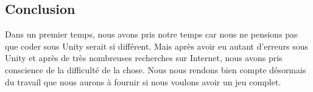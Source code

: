 \documentclass[]{extarticle}
\begin{document}
\begin{spacing}{1.25}
\section{Conclusion}
\bigbreak
\bigbreak
Dans un premier temps, nous avons pris notre temps car nous ne pensions pas que coder sous Unity serait si différent. Mais après avoir eu autant d'erreurs sous Unity et après de très nombreuses recherches sur Internet, nous avons pris conscience de la difficulté de la chose. Nous nous rendons bien compte désormais du travail que nous aurons à fournir si nous voulons avoir un jeu complet. 
\end{spacing}
\end{document}
